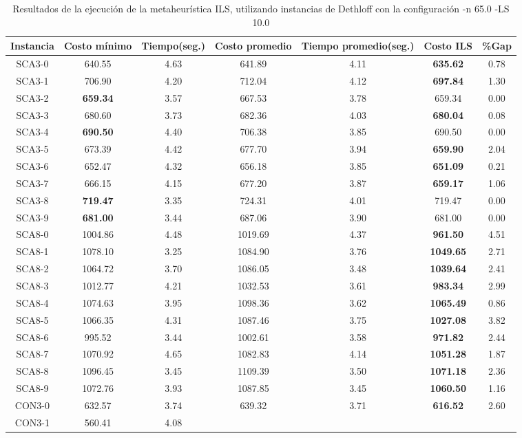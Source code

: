 \begin{table}[ht]
\caption{Resultados de la ejecución de la metaheurística ILS, utilizando instancias de Dethloff con la configuración -n 65.0 -LS 10.0}
\centering
\small
\begin{tabular}{c c c c c c c}
\hline\hline
Instancia & Costo mínimo & Tiempo(seg.) & Costo promedio & Tiempo promedio(seg.) & Costo ILS & \%Gap \\ [0.5ex]
\hline
SCA3-0 & 640.55 & 4.63 & 
641.89 & 4.11 & \bf{635.62} & 
0.78\\SCA3-1 & 706.90 & 4.20 & 
712.04 & 4.12 & \bf{697.84} & 
1.30\\SCA3-2 & \bf{659.34} & 3.57 & 
667.53 & 3.78 & 659.34 & 0.00\\
SCA3-3 & 680.60 & 3.73 & 
682.36 & 4.03 & \bf{680.04} & 
0.08\\SCA3-4 & \bf{690.50} & 4.40 & 
706.38 & 3.85 & 690.50 & 0.00\\
SCA3-5 & 673.39 & 4.42 & 
677.70 & 3.94 & \bf{659.90} & 
2.04\\SCA3-6 & 652.47 & 4.32 & 
656.18 & 3.85 & \bf{651.09} & 
0.21\\SCA3-7 & 666.15 & 4.15 & 
677.20 & 3.87 & \bf{659.17} & 
1.06\\SCA3-8 & \bf{719.47} & 3.35 & 
724.31 & 4.01 & 719.47 & 0.00\\
SCA3-9 & \bf{681.00} & 3.44 & 
687.06 & 3.90 & 681.00 & 0.00\\
SCA8-0 & 1004.86 & 4.48 & 
1019.69 & 4.37 & \bf{961.50} & 
4.51\\SCA8-1 & 1078.10 & 3.25 & 
1084.90 & 3.76 & \bf{1049.65} & 
2.71\\SCA8-2 & 1064.72 & 3.70 & 
1086.05 & 3.48 & \bf{1039.64} & 
2.41\\SCA8-3 & 1012.77 & 4.21 & 
1032.53 & 3.61 & \bf{983.34} & 
2.99\\SCA8-4 & 1074.63 & 3.95 & 
1098.36 & 3.62 & \bf{1065.49} & 
0.86\\SCA8-5 & 1066.35 & 4.31 & 
1087.46 & 3.75 & \bf{1027.08} & 
3.82\\SCA8-6 & 995.52 & 3.44 & 
1002.61 & 3.58 & \bf{971.82} & 
2.44\\SCA8-7 & 1070.92 & 4.65 & 
1082.83 & 4.14 & \bf{1051.28} & 
1.87\\SCA8-8 & 1096.45 & 3.45 & 
1109.39 & 3.50 & \bf{1071.18} & 
2.36\\SCA8-9 & 1072.76 & 3.93 & 
1087.85 & 3.45 & \bf{1060.50} & 
1.16\\CON3-0 & 632.57 & 3.74 & 
639.32 & 3.71 & \bf{616.52} & 
2.60\\CON3-1 & 560.41 & 4.08 & 

\end{tabular}
\end{table}
